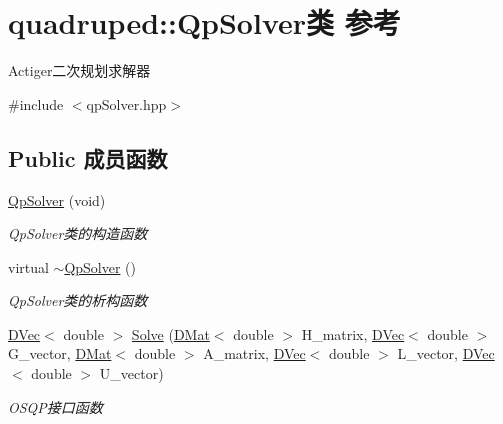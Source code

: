 \hypertarget{classquadruped_1_1QpSolver}{}\section{quadruped\+:\+:Qp\+Solver类 参考}
\label{classquadruped_1_1QpSolver}


Actiger二次规划求解器  




{\ttfamily \#include $<$qp\+Solver.\+hpp$>$}

\subsection*{Public 成员函数}
\begin{DoxyCompactItemize}
\item 
\mbox{\label{classquadruped_1_1QpSolver_a5d922f96db12999e83b877dfc3847acf}} 
\hyperlink{classquadruped_1_1QpSolver_a5d922f96db12999e83b877dfc3847acf}{Qp\+Solver} (void)
\begin{DoxyCompactList}\small\item\em Qp\+Solver类的构造函数 \end{DoxyCompactList}\item 
\mbox{\label{classquadruped_1_1QpSolver_af6171cfe493ce1f01b1a901d4d9c88e0}} 
virtual \hyperlink{classquadruped_1_1QpSolver_af6171cfe493ce1f01b1a901d4d9c88e0}{$\sim$\+Qp\+Solver} ()
\begin{DoxyCompactList}\small\item\em Qp\+Solver类的析构函数 \end{DoxyCompactList}\item 
\hyperlink{cppTypes_8h_adad69baca3c77d5f991be5d3c063fea7}{D\+Vec}$<$ double $>$ \hyperlink{classquadruped_1_1QpSolver_a85fdc322c59b234ce39d4ec381eadf35}{Solve} (\hyperlink{cppTypes_8h_a5db6bfb25afa103db1fb6bb6287ae9d7}{D\+Mat}$<$ double $>$ H\+\_\+matrix, \hyperlink{cppTypes_8h_adad69baca3c77d5f991be5d3c063fea7}{D\+Vec}$<$ double $>$ G\+\_\+vector, \hyperlink{cppTypes_8h_a5db6bfb25afa103db1fb6bb6287ae9d7}{D\+Mat}$<$ double $>$ A\+\_\+matrix, \hyperlink{cppTypes_8h_adad69baca3c77d5f991be5d3c063fea7}{D\+Vec}$<$ double $>$ L\+\_\+vector, \hyperlink{cppTypes_8h_adad69baca3c77d5f991be5d3c063fea7}{D\+Vec}$<$ double $>$ U\+\_\+vector)
\begin{DoxyCompactList}\small\item\em O\+S\+Q\+P接口函数 \end{DoxyCompactList}\end{DoxyCompactItemize}


